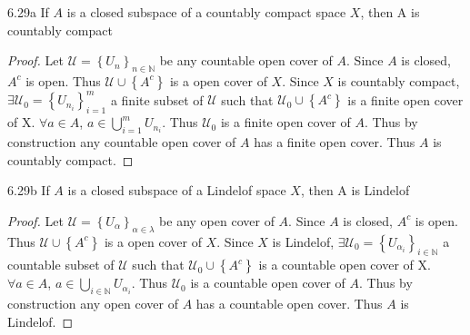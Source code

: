 \documentclass{article}
\newcommand{\N}{\mathbb{N}}
\begin{document}
\bigskip

\begin{claim}{6.29a}\label{Claim 6.29a.}
    If $A$ is a closed subspace of a countably compact space $X$, then A is countably compact 
\end{claim}
\begin{proof}
    Let $\mathcal{U} = \left\{ U_{n} \right\}_{n \in \N}$ be any countable open cover of $A$. Since $A$ is closed, $A^c$ is open. Thus $\mathcal{U} \cup \left\{ A^c \right\}$ is a open cover of $X$. Since $X$ is countably compact, $\exists \mathcal{U}_0 = \left\{ U_{n_i} \right\}_{i = 1}^m$ a finite subset of $\mathcal{U}$ such that $\mathcal{U}_0 \cup \left\{ A^c \right\}$ is a finite open cover of X. $\forall a \in A$, $a \in \bigcup_{i = 1}^m U_{n_i}$. Thus $\mathcal{U}_0$ is a finite open cover of $A$. Thus by construction any countable open cover of $A$ has a finite open cover. Thus $A$ is countably compact.                    
\end{proof}

\bigskip

\begin{claim}{6.29b}\label{Claim 6.29b.}
    If $A$ is a closed subspace of a Lindelof space $X$, then A is Lindelof 
\end{claim}
\begin{proof}
    Let $\mathcal{U} = \left\{ U_{\alpha} \right\}_{\alpha \in \lambda}$ be any open cover of $A$. Since $A$ is closed, $A^c$ is open. Thus $\mathcal{U} \cup \left\{ A^c \right\}$ is a open cover of $X$. Since $X$ is Lindelof, $\exists \mathcal{U}_0 = \left\{ U_{\alpha_i} \right\}_{i \in \N}$ a countable subset of $\mathcal{U}$ such that $\mathcal{U}_0 \cup \left\{ A^c \right\}$ is a countable open cover of X. $\forall a \in A$, $a \in \bigcup_{i \in \N} U_{\alpha_i}$. Thus $\mathcal{U}_0$ is a countable open cover of $A$. Thus by construction any open cover of $A$ has a countable open cover. Thus $A$ is Lindelof.                    
\end{proof}

\bigskip
\end{document}
